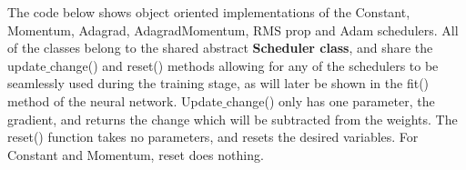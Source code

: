 \documentclass[%
oneside,                 %
final,                   %
10pt]{article}
\begin{document}
The code below shows object oriented implementations of the Constant,
Momentum, Adagrad, AdagradMomentum, RMS prop and Adam schedulers. All
of the classes belong to the shared abstract \textbf{Scheduler class}, and
share the update$\_$change() and reset() methods allowing for any of the
schedulers to be seamlessly used during the training stage, as will
later be shown in the fit() method of the neural
network. Update$\_$change() only has one parameter, the gradient, and returns the change which will be subtracted
from the weights. The reset() function takes no parameters, and resets
the desired variables. For Constant and Momentum, reset does nothing.
\end{document}
